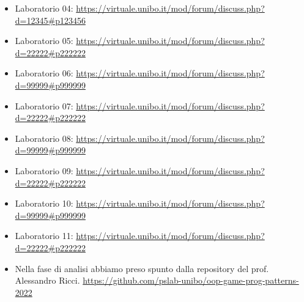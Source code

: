 \documentclass[a4paper,12pt]{report}
\begin{document}
\begin{itemize}
 \item Laboratorio 04: \url{https://virtuale.unibo.it/mod/forum/discuss.php?d=12345#p123456}
 \item Laboratorio 05: \url{https://virtuale.unibo.it/mod/forum/discuss.php?d=22222#p222222}
 \item Laboratorio 06: \url{https://virtuale.unibo.it/mod/forum/discuss.php?d=99999#p999999}
 \item Laboratorio 07: \url{https://virtuale.unibo.it/mod/forum/discuss.php?d=22222#p222222}
 \item Laboratorio 08: \url{https://virtuale.unibo.it/mod/forum/discuss.php?d=99999#p999999}
 \item Laboratorio 09: \url{https://virtuale.unibo.it/mod/forum/discuss.php?d=22222#p222222}
 \item Laboratorio 10: \url{https://virtuale.unibo.it/mod/forum/discuss.php?d=99999#p999999}
 \item Laboratorio 11: \url{https://virtuale.unibo.it/mod/forum/discuss.php?d=22222#p222222}
\end{itemize}




\begin{itemize}
    \item Nella fase di analisi abbiamo preso spunto dalla repository del prof. Alessandro Ricci. 
    \url{https://github.com/pslab-unibo/oop-game-prog-patterns-2022} 
\end{itemize}
\end{document}
